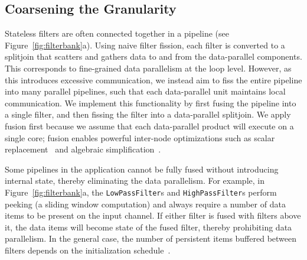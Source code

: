 \subsection{Coarsening the Granularity}

Stateless filters are often connected together in a pipeline (see
Figure~\ref{fig:filterbank}a).  Using naive filter fission, each
filter is converted to a splitjoin that scatters and gathers data to
and from the data-parallel components.  This corresponds to
fine-grained data parallelism at the loop level.  However, as this
introduces excessive communication, we instead aim to fiss the entire
pipeline into many parallel pipelines, such that each data-parallel
unit maintains local communication.  We implement this functionality
by first fusing the pipeline into a single filter, and then fissing
the filter into a data-parallel splitjoin.  We apply fusion first
because we assume that each data-parallel product will execute on a
single core; fusion enables powerful inter-node optimizations such as
scalar replacement~\cite{sermulins:lctes:2005} and algebraic
simplification~\cite{agrawal:cases:2005,lamb:pldi:2003}.

Some pipelines in the application cannot be fully fused without
introducing internal state, thereby eliminating the data parallelism.
For example, in Figure~\ref{fig:filterbank}a, the {\tt LowPassFilter}s
and {\tt HighPassFilter}s perform peeking (a sliding window
computation) and always require a number of data items to be present
on the input channel.  If either filter is fused with filters above
it, the data items will become state of the fused filter, thereby
prohibiting data parallelism.  In the general case, the number of
persistent items buffered between filters depends on the
initialization schedule~\cite{karczma-thesis}.


